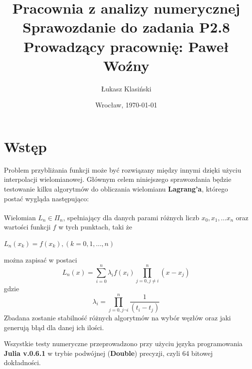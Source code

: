 \documentclass[11pt, wide]{article}
\date{Wrocław, \today}
\title{\LARGE\textbf{Pracownia z analizy numerycznej}\\Sprawozdanie do zadania \textbf{P2.8}\\
    Prowadzący pracownię: Paweł Woźny}
\author{Łukasz Klasiński}
\begin{document}
    \maketitle
    \thispagestyle{empty}
    \section{Wstęp}
    Problem przybliżania funkcji może być rozwiązany między innymi dzięki
    użyciu interpolacji wielomianowej. Głównym celem niniejszego sprawozdania
    będzie testowanie kilku algorytmów do obliczania wielomianu \textbf{Lagrang'a}, 
    którego postać wygląda następująco:
    \\
    \\
    Wielomian $L_n \in \Pi _n$, spełniający dla danych parami różnych liczb $x_0, x_1, \ldots x_n$ 
    oraz wartości funkcji $f$ w tych punktach, taki że 
    \\\begin{center}
        $L_n(x_k) = f(x_k), (k = 0,1,\ldots,n)$
    \end{center}
    można zapisać w postaci
    \begin{equation}\label{Lagrange}
        L_n(x) = \sum_{i=0}^{n} \lambda_i f(x_i) \prod_{j=0,j\neq i}^{n}(x - x_j)
    \end{equation}
    gdzie
    \begin{equation}
        \lambda_i = \prod_{j=0,j\neg i}^{n}\frac{1}{(t_i - t_j)}
    \end{equation}
    Zbadana zostanie stabilność różnych algorytmów na wybór węzłów oraz jaki generują błąd 
    dla danej ich ilości.
    
    Wszystkie testy numeryczne przeprowadzono przy użyciu języka programowania \textbf{Julia v.0.6.1} w trybie 
    podwójnej (\textbf{Double}) precyzji, czyli 64 bitowej dokładności.
\end{document}
